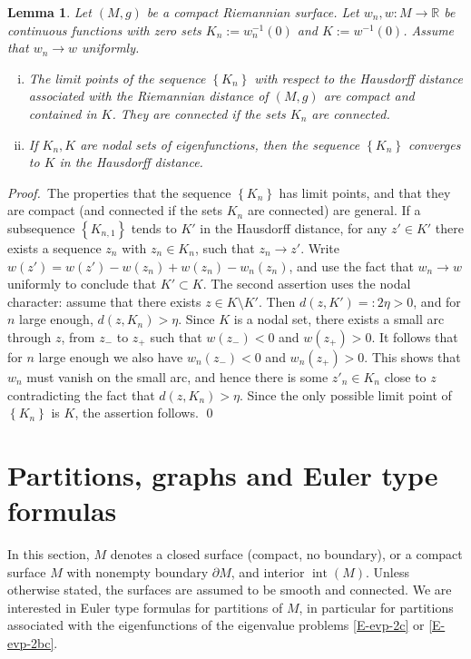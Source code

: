 \documentclass[12pt,a4paper]{amsart}
\theoremstyle{plain} %
\newtheorem{lemma}[theorem]{Lemma}
\theoremstyle{definition}
\numberwithin{equation}{section}
\numberwithin{figure}{section}
\numberwithin{table}{section}
\newcommand{\R}{\mathbb{R}}
\DeclareMathOperator{\inte}{int}
\newcommand{\pf}{\emph{Proof.~}}
\newcommand{\sm}{\!\setminus\!}
\newcommand{\set}[1]{\left\lbrace #1 \right\rbrace}
\begin{document}
\begin{lemma}\label{L-hdn}
Let $(M,g)$ be a compact Riemannian surface. Let $w_n, w : M \to \R$ be continuous functions with zero sets $K_n := w_n^{-1}(0)$ and $K := w^{-1}(0)$. Assume that $w_n \to w$ uniformly.
\begin{enumerate}[(i)]
  \item The limit points of the sequence $\set{K_n}$ with respect to the Hausdorff distance associated with the Riemannian distance of $(M,g)$ are compact and contained in $K$. They are connected if the sets $K_n$ are connected.
  \item If $K_n, K$ are nodal sets of eigenfunctions, then the sequence $\set{K_n}$ converges to $K$ in the Hausdorff distance.
\end{enumerate}
\end{lemma}%

\pf The properties that the sequence $\set{K_n}$ has limit points, and that they are compact (and connected if the sets $K_n$ are connected) are general. If a subsequence  $\set{K_{n,1}}$ tends to $K'$ in the Hausdorff distance, for any $z' \in K'$ there exists a sequence $z_n$ with $z_n \in K_n$, such that $z_n \to z'$. Write $w(z') = w(z') - w(z_n) + w(z_n) - w_n(z_n)$, and use the fact that $w_n \to w$ uniformly to conclude that $K' \subset K$. The second assertion uses the nodal character: assume that there exists $z \in K \sm K'$. Then $d(z,K') =: 2\eta > 0$, and for $n$ large enough, $d(z,K_n) > \eta$. Since $K$ is a nodal set, there exists a small arc through $z$, from $z_{-}$ to $z_{+}$ such that $w(z_{-}) < 0$ and $w(z_{+}) > 0$. It follows that for $n$ large enough we also have $w_n(z_{-}) < 0$ and $w_n(z_{+}) > 0$. This shows that $w_n$ must vanish on the small arc, and hence there is some $z'_n \in K_n$ close to $z$ contradicting the fact that $d(z,K_n) > \eta$. Since the only possible limit point of $\set{K_n}$ is $K$, the assertion follows. \hfill \qed


\section{Partitions, graphs and Euler type formulas}\label{S-pargef}


In this section, $M$ denotes a closed surface (compact, no boundary), or a compact surface $M$ with nonempty boundary $\partial M$, and interior $\inte(M)$. Unless otherwise stated, the surfaces are assumed to be smooth and connected. We are interested in Euler type formulas for partitions of $M$, in particular for partitions associated with the eigenfunctions of the eigenvalue problems \eqref{E-evp-2c} or \eqref{E-evp-2bc}.
\end{document}
